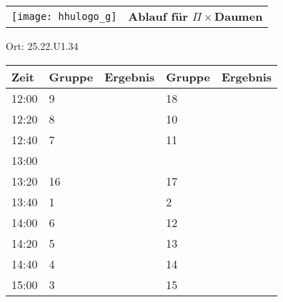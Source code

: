 \documentclass[a4paper,10pt]{article}
\def\spieli{$\Pi \times $Daumen}
\def\raumi{25.22.U1.34}
\begin{document}
  \begin{tabularx}{\textwidth}{lc}
    \texttt{[image: hhulogo\_g]}
  & {\Huge \textbf{Ablauf für  \spieli}}
  \end{tabularx}
  \LARGE
  \begin{center}
    \vspace{1cm} 
    Ort: \raumi
  \end{center}
    \vspace{2cm} 
    \begin{tabularx}{\textwidth}{X||X|X||X|X}
	\textbf{Zeit} &\textbf{Gruppe} & \textbf{Ergebnis} &\textbf{Gruppe} & \textbf{Ergebnis}  	\\ \hline \hline
	12:00 &	9	&	&18	&	\\ \hline
	12:20 &	8	&	&10	&	\\ \hline
	12:40 &	7	&	&11	&	\\ \hline

	13:00 &		&	&	&	\\ \hline
	13:20 &	16	&	&17	&	\\ \hline
	13:40 &	1	&	&2	&	\\ \hline

	14:00 &	6	&	&12	&	\\ \hline
	14:20 &	5	&	&13	&	\\ \hline
	14:40 &	4	&	&14	&	\\ \hline

	15:00 &	3	&	&15	&	\\ \hline
      
    \end{tabularx}
   
   \newpage
\end{document}
